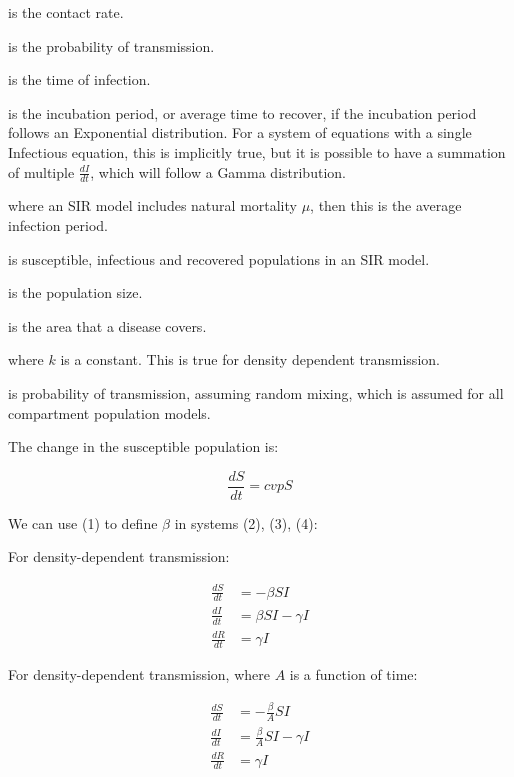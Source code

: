 \documentclass[twocolumn]{article}
\begin{document}
\begin{description}[leftmargin=1cm, style=nextline]
  \item[$ c $]
    is the contact rate.
  \item[$ v $]
    is the probability of transmission.
  \item[$ T_1 $]
    is the time of infection.
  \item[$ T_2 - T_1 = \frac{1}{\gamma}$]
    is the incubation period, or average time to recover, if the incubation period follows an Exponential distribution. For a system of equations with a single Infectious equation, this is implicitly true, but it is possible to have a summation of multiple $ \frac{dI}{dt} $, which will follow a Gamma distribution.
  \item[$\frac{1}{\mu + \gamma}$]
    where an SIR model includes natural mortality $ \mu $, then this is the average infection period.
  \item[$ S, I, R $]
    is susceptible, infectious and recovered populations in an SIR model.
  \item[$ N = S+I+R $]
    is the population size.
  \item[$ A $]
    is the area that a disease covers.
  \item[$ c = \frac{kN}{A} $]
    where $ k $ is a constant. This is true for density dependent transmission.
  \item[$ p := \frac{I}{N} $]
    is probability of transmission, assuming random mixing, which is assumed for all compartment population models.
\end{description}

The change in the susceptible population is:

\begin{equation}
    \frac{dS}{dt} = cvpS
\end{equation}

We can use (1) to define $ \beta $ in systems (2), (3), (4):

For density-dependent transmission:

\begin{align}
    \frac{dS}{dt} &= -\beta SI \nonumber \\
    \frac{dI}{dt} &= \beta SI - \gamma I \\
    \frac{dR}{dt} &= \gamma I \nonumber
\end{align}

For density-dependent transmission, where $ A $ is a function of time:

\begin{align}
    \frac{dS}{dt} &= -\frac{\beta}{A} SI \nonumber \\
    \frac{dI}{dt} &= \frac{\beta}{A} SI - \gamma I \\
    \frac{dR}{dt} &= \gamma I \nonumber
\end{align}
\end{document}
